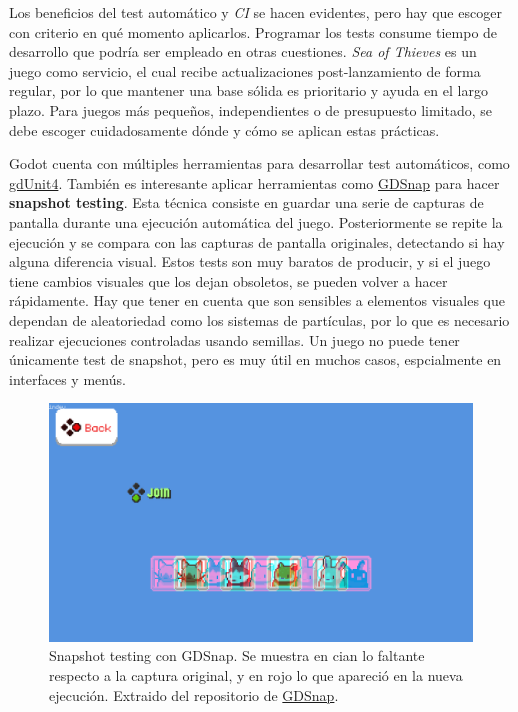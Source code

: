 Los beneficios del test automático y \textit{CI} se hacen evidentes, pero hay que escoger con criterio en qué momento aplicarlos. Programar los tests consume tiempo de desarrollo que podría ser empleado en otras cuestiones. \textit{Sea of Thieves} es un juego como servicio, el cual recibe actualizaciones post-lanzamiento de forma regular, por lo que mantener una base sólida es prioritario y ayuda en el largo plazo. Para juegos más pequeños, independientes o de presupuesto limitado, se debe escoger cuidadosamente dónde y cómo se aplican estas prácticas.

Godot cuenta con múltiples herramientas para desarrollar test automáticos, como \href{https://github.com/MikeSchulze/gdUnit4}{gdUnit4}. También es interesante aplicar herramientas como \href{https://github.com/Nokorpo/GDSnap}{GDSnap} para hacer \textbf{snapshot testing}. Esta técnica consiste en guardar una serie de capturas de pantalla durante una ejecución automática del juego. Posteriormente se repite la ejecución y se compara con las capturas de pantalla originales, detectando si hay alguna diferencia visual. Estos tests son muy baratos de producir, y si el juego tiene cambios visuales que los dejan obsoletos, se pueden volver a hacer rápidamente. Hay que tener en cuenta que son sensibles a elementos visuales que dependan de aleatoriedad como los sistemas de partículas, por lo que es necesario realizar ejecuciones controladas usando semillas. Un juego no puede tener únicamente test de snapshot, pero es muy útil en muchos casos, espcialmente en interfaces y menús.

\begin{figure}[h]
    \centering
    \includegraphics[scale=0.3]{img/snapshot-test.png}
    \caption[Snapshot Testing]{Snapshot testing con GDSnap. Se muestra en cian lo faltante respecto a la captura original, y en rojo lo que apareció en la nueva ejecución. Extraido del repositorio de \href{https://github.com/Nokorpo/GDSnap}{GDSnap}.}
    \label{fig:nuts-and-bolts}
\end{figure}

